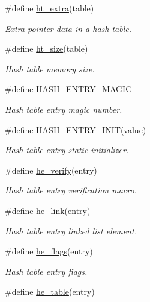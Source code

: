 \begin{CompactItemize}
\#define \hyperlink{group__dbprim__hash_ga35}{ht\_\-extra}(table)
\begin{CompactList}\small\item\em Extra pointer data in a hash table. \item\end{CompactList}\item 
\#define \hyperlink{group__dbprim__hash_ga36}{ht\_\-size}(table)
\begin{CompactList}\small\item\em Hash table memory size. \item\end{CompactList}\item 
\#define \hyperlink{group__dbprim__hash_ga37}{HASH\_\-ENTRY\_\-MAGIC}
\begin{CompactList}\small\item\em Hash table entry magic number. \item\end{CompactList}\item 
\#define \hyperlink{group__dbprim__hash_ga38}{HASH\_\-ENTRY\_\-INIT}(value)
\begin{CompactList}\small\item\em Hash table entry static initializer. \item\end{CompactList}\item 
\#define \hyperlink{group__dbprim__hash_ga39}{he\_\-verify}(entry)
\begin{CompactList}\small\item\em Hash table entry verification macro. \item\end{CompactList}\item 
\#define \hyperlink{group__dbprim__hash_ga40}{he\_\-link}(entry)
\begin{CompactList}\small\item\em Hash table entry linked list element. \item\end{CompactList}\item 
\#define \hyperlink{group__dbprim__hash_ga41}{he\_\-flags}(entry)
\begin{CompactList}\small\item\em Hash table entry flags. \item\end{CompactList}\item 
\#define \hyperlink{group__dbprim__hash_ga42}{he\_\-table}(entry)

\end{CompactItemize}
